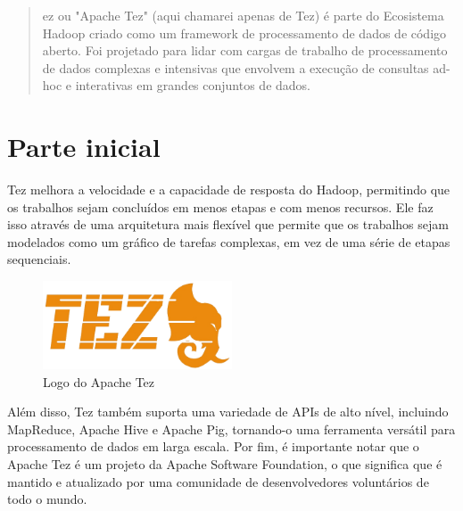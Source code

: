 \documentclass[a4paper,11pt]{article}
\begin{document}
	
	\maketitle %
	\thispagestyle{fancy} %
	
\begin{abstract}
	ez\cite{tezoficial} ou "Apache Tez" (aqui chamarei apenas de Tez) é parte do Ecosistema Hadoop criado como um framework de processamento de dados de código aberto. Foi projetado para lidar com cargas de trabalho de processamento de dados complexas e intensivas que envolvem a execução de consultas ad-hoc e interativas em grandes conjuntos de dados.
\end{abstract}

\section{Parte inicial}
Tez melhora a velocidade e a capacidade de resposta do Hadoop, permitindo que os trabalhos sejam concluídos em menos etapas e com menos recursos. Ele faz isso através de uma arquitetura mais flexível que permite que os trabalhos sejam modelados como um gráfico de tarefas complexas, em vez de uma série de etapas sequenciais.
\begin{figure}[H]
	\centering
	\includegraphics[width=0.5\textwidth]{imagem/logo}
	\caption{Logo do Apache Tez}
\end{figure}

Além disso, Tez também suporta uma variedade de APIs de alto nível, incluindo MapReduce, Apache Hive e Apache Pig, tornando-o uma ferramenta versátil para processamento de dados em larga escala. Por fim, é importante notar que o Apache Tez é um projeto da Apache Software Foundation, o que significa que é mantido e atualizado por uma comunidade de desenvolvedores voluntários de todo o mundo.
\end{document}
